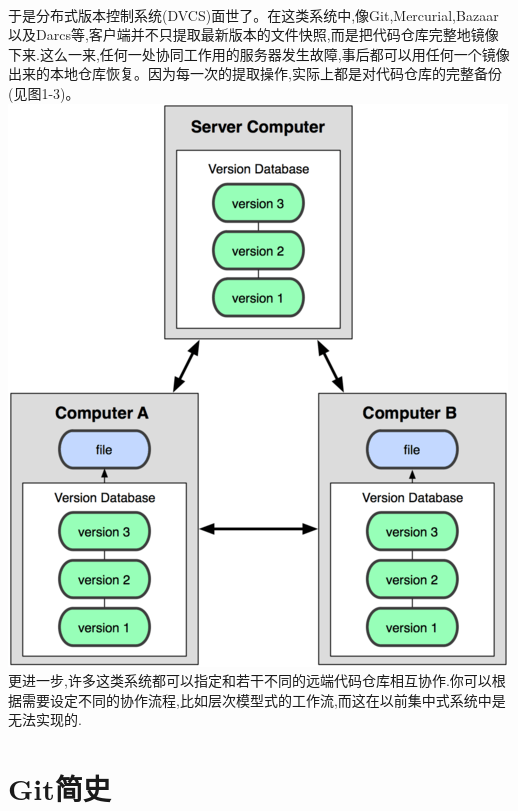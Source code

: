 \documentclass{book}
\begin{document}
	\paragraph{}
	于是分布式版本控制系统(DVCS)面世了。在这类系统中,像Git,Mercurial,Bazaar 以及Darcs等,客户端并不只提取最新版本的文件快照,而是把代码仓库完整地镜像下来.这么一来,任何一处协同工作用的服务器发生故障,事后都可以用任何一个镜像出来的本地仓库恢复。因为每一次的提取操作,实际上都是对代码仓库的完整备份(见图1-3)。\\
	\includegraphics{1-3.png}\\
	更进一步,许多这类系统都可以指定和若干不同的远端代码仓库相互协作.你可以根据需要设定不同的协作流程,比如层次模型式的工作流,而这在以前集中式系统中是无法实现的.\\

	\section{Git简史}
\end{document}
